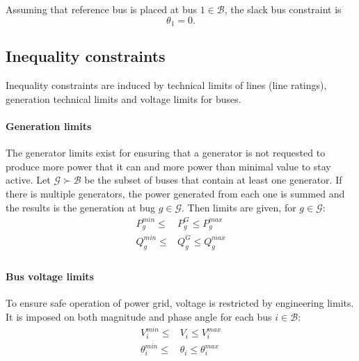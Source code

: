 Assuming that reference bus is placed at bus $1 \in \mathcal{B}$, the slack bus constraint is
\begin{equation}
    \theta_1 = 0.
    \label{eq:slack_bus}
\end{equation}
\subsection{Inequality constraints}

Inequality constraints are induced by technical limits of lines (line ratings), generation technical limits and voltage limits for buses.

\paragraph{Generation limits}

The generator limits exist for ensuring that a generator is not requested to produce more power that it can and more power than minimal value to stay active. Let $\mathcal{G} \succ \mathcal{B}$ be the subset of buses that contain at least one generator. If there is multiple generators, the power generated from each one is summed and the results is the generation at bug $g \in \mathcal{G}$. Then limits are given, for $g \in \mathcal{G}$:
\begin{equation}
    \begin{aligned}
        P_g^{min} \leq &P_g^G \leq P_g^{max} \\
        Q_g^{min} \leq &Q_g^G \leq Q_g^{max} \\
        \label{eq:gen_lims}
    \end{aligned}
\end{equation}

\paragraph{Bus voltage limits}

To ensure safe operation of power grid, voltage is restricted by engineering limits. It is imposed on both magnitude and phase angle for each bus $i \in \mathcal{B}$:
\begin{equation}
    \begin{aligned}
        V_i^{min} \leq &V_i \leq V_i^{max} \\
        \theta_i^{min} \leq &\theta_i \leq \theta_i^{max} \\
        \label{eq:vol_lims}
    \end{aligned}
\end{equation}


